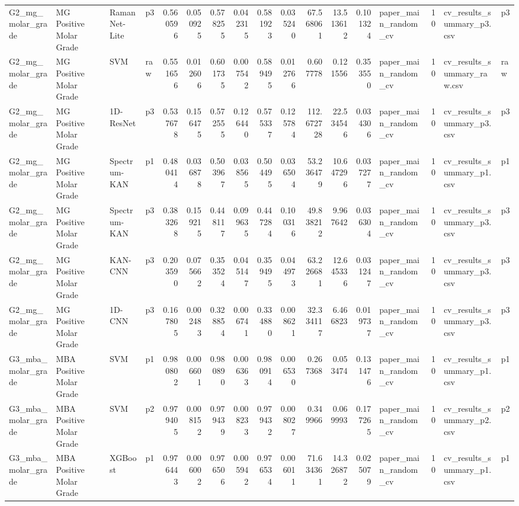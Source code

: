\begin{tabular}{llllrrrrrrrrrlrll}
G2_mg_molar_grade & MG Positive Molar Grade & RamanNet-Lite & p3 & 0.560596 & 0.050925 & 0.578255 & 0.042315 & 0.581923 & 0.035240 & 67.568061 & 13.513612 & 0.101324 & paper_main_random_cv & 10 & cv_results_summary_p3.csv & p3 \\
G2_mg_molar_grade & MG Positive Molar Grade & SVM & raw & 0.551656 & 0.012606 & 0.601735 & 0.007542 & 0.589495 & 0.012766 & 0.607778 & 0.121556 & 0.353550 & paper_main_random_cv & 10 & cv_results_summary_raw.csv & raw \\
G2_mg_molar_grade & MG Positive Molar Grade & 1D-ResNet & p3 & 0.537678 & 0.156475 & 0.572555 & 0.126440 & 0.575337 & 0.125784 & 112.672728 & 22.534546 & 0.034306 & paper_main_random_cv & 10 & cv_results_summary_p3.csv & p3 \\
G2_mg_molar_grade & MG Positive Molar Grade & Spectrum-KAN & p1 & 0.480414 & 0.036878 & 0.503967 & 0.038565 & 0.504495 & 0.036504 & 53.236479 & 10.647296 & 0.037277 & paper_main_random_cv & 10 & cv_results_summary_p1.csv & p1 \\
G2_mg_molar_grade & MG Positive Molar Grade & Spectrum-KAN & p3 & 0.383268 & 0.159215 & 0.448117 & 0.099635 & 0.447284 & 0.100316 & 49.838212 & 9.967642 & 0.036304 & paper_main_random_cv & 10 & cv_results_summary_p3.csv & p3 \\
G2_mg_molar_grade & MG Positive Molar Grade & KAN-CNN & p3 & 0.203590 & 0.075662 & 0.353524 & 0.045147 & 0.359495 & 0.044973 & 63.226681 & 12.645336 & 0.031247 & paper_main_random_cv & 10 & cv_results_summary_p3.csv & p3 \\
G2_mg_molar_grade & MG Positive Molar Grade & 1D-CNN & p3 & 0.167805 & 0.002483 & 0.328854 & 0.006741 & 0.334880 & 0.008621 & 32.334117 & 6.466823 & 0.019737 & paper_main_random_cv & 10 & cv_results_summary_p3.csv & p3 \\
G3_mba_molar_grade & MBA Positive Molar Grade & SVM & p1 & 0.980802 & 0.006601 & 0.980890 & 0.006363 & 0.980914 & 0.006530 & 0.267368 & 0.053474 & 0.131476 & paper_main_random_cv & 10 & cv_results_summary_p1.csv & p1 \\
G3_mba_molar_grade & MBA Positive Molar Grade & SVM & p2 & 0.979405 & 0.008152 & 0.979439 & 0.008233 & 0.979432 & 0.008027 & 0.349966 & 0.069993 & 0.177265 & paper_main_random_cv & 10 & cv_results_summary_p2.csv & p2 \\
G3_mba_molar_grade & MBA Positive Molar Grade & XGBoost & p1 & 0.976443 & 0.006002 & 0.976506 & 0.005942 & 0.976534 & 0.006011 & 71.634361 & 14.326872 & 0.025079 & paper_main_random_cv & 10 & cv_results_summary_p1.csv & p1 \\

\end{tabular}
